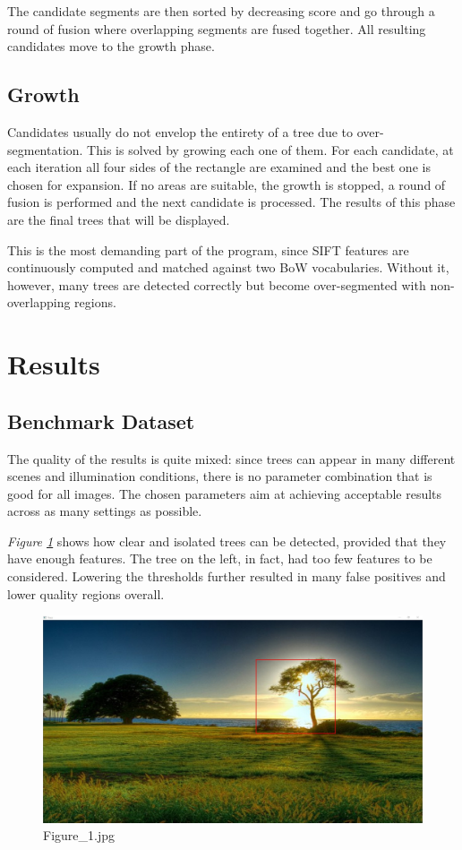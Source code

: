\documentclass{article}
\begin{document}
The candidate segments are then sorted by decreasing score and go through a round of fusion where overlapping segments are fused together. All resulting candidates move to the growth phase.

\subsection{Growth}
Candidates usually do not envelop the entirety of a tree due to over-segmentation. This is solved by growing each one of them.
For each candidate, at each iteration all four sides of the rectangle are examined and the best one is chosen for expansion. If no areas are suitable, the growth is stopped, a round of fusion is performed and the next candidate is processed.
The results of this phase are the final trees that will be displayed.

This is the most demanding part of the program, since SIFT features are continuously computed and matched against two BoW vocabularies. Without it, however, many trees are detected correctly but become over-segmented with non-overlapping regions.

\section{Results}
\subsection{Benchmark Dataset}
The quality of the results is quite mixed: since trees can appear in many different scenes and illumination conditions, there is no parameter combination that is good for all images.
The chosen parameters aim at achieving acceptable results across as many settings as possible.

\textit{Figure \ref{img:benchmark1}} shows how clear and isolated trees can be detected, provided that they have enough features. The tree on the left, in fact, had too few features to be considered. Lowering the thresholds further resulted in many false positives and lower quality regions overall.

\begin{figure}[h]
\begin{center}
\includegraphics[width=1\textwidth]{images/b1}
\caption{\footnotesize{Figure\_1.jpg}}
\label{img:benchmark1}
\end{center}
\end{figure}
\end{document}
